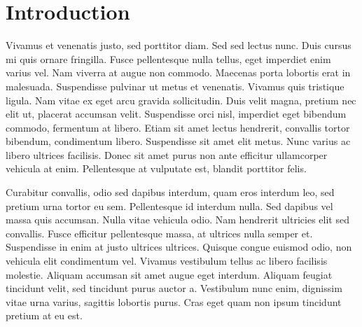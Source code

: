 \section{Introduction}
\label{sec:intro}
Vivamus et venenatis justo, sed porttitor diam. Sed sed lectus nunc. Duis cursus mi quis ornare fringilla. Fusce pellentesque nulla tellus, eget imperdiet enim varius vel. Nam viverra at augue non commodo. Maecenas porta lobortis erat in malesuada. Suspendisse pulvinar ut metus et venenatis. Vivamus quis tristique ligula. Nam vitae ex eget arcu gravida sollicitudin. Duis velit magna, pretium nec elit ut, placerat accumsan velit. Suspendisse orci nisl, imperdiet eget bibendum commodo, fermentum at libero. Etiam sit amet lectus hendrerit, convallis tortor bibendum, condimentum libero. Suspendisse sit amet elit metus. Nunc varius ac libero ultrices facilisis. Donec sit amet purus non ante efficitur ullamcorper vehicula at enim. Pellentesque at vulputate est, blandit porttitor felis.

Curabitur convallis, odio sed dapibus interdum, quam eros interdum leo, sed pretium urna tortor eu sem. Pellentesque id interdum nulla. Sed dapibus vel massa quis accumsan. Nulla vitae vehicula odio. Nam hendrerit ultricies elit sed convallis. Fusce efficitur pellentesque massa, at ultrices nulla semper et. Suspendisse in enim at justo ultrices ultrices. Quisque congue euismod odio, non vehicula elit condimentum vel. Vivamus vestibulum tellus ac libero facilisis molestie. Aliquam accumsan sit amet augue eget interdum. Aliquam feugiat tincidunt velit, sed tincidunt purus auctor a. Vestibulum nunc enim, dignissim vitae urna varius, sagittis lobortis purus. Cras eget quam non ipsum tincidunt pretium at eu est. 